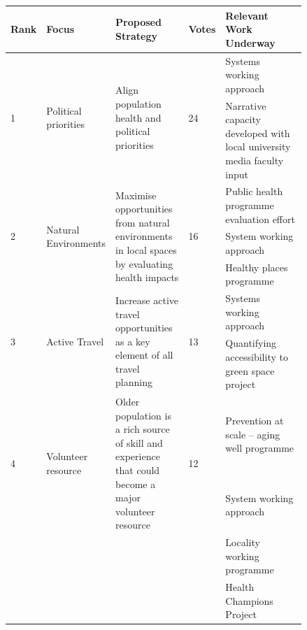 \begin{table}[h]
	\begin{center}
		\footnotesize%
		\begin{tabularx}{\linewidth}{p{0.04\linewidth} p{0.135\linewidth} p{0.275\linewidth} p{0.045\linewidth} p{0.35\linewidth}}
			\toprule
			Rank & Focus & Proposed Strategy & Votes & Relevant Work Underway \\
			\midrule
			\multirow{2}{*}{1} & \multirow{2}{\hsize}{Political priorities} & \multirow{2}{\hsize}{Align population health and political priorities} & \multirow{2}{*}{24} & Systems working approach\vspace{0.5\baselineskip} \\
			& & & & Narrative capacity developed with local university media faculty input\vspace{\baselineskip}\\
			
			\multirow{3}{*}{2} & \multirow{3}{\hsize}{Natural Environments} & \multirow{3}{\hsize}{Maximise opportunities from natural environments in local spaces by evaluating health impacts} & \multirow{3}{*}{16} & Public health programme evaluation effort\vspace{0.5\baselineskip} \\
			& & & & System working approach\vspace{0.5\baselineskip} \\
			& & & & Healthy places programme\vspace{\baselineskip} \\
			
			\multirow{2}{*}{3} & \multirow{2}{\hsize}{Active Travel} & \multirow{2}{\hsize}{Increase active travel opportunities as a key element of all travel planning} & \multirow{2}{*}{13} & Systems working approach\vspace{0.5\baselineskip} \\
			& & & & Quantifying accessibility to green space project\vspace{\baselineskip} \\

			\multirow{2}{*}{4} & \multirow{2}{\hsize}{Volunteer resource} & \multirow{2}{\hsize}{Older population is a rich source of skill and experience that could become a major volunteer resource} & \multirow{2}{*}{12} & Prevention at scale – aging well programme\vspace{0.5\baselineskip} \\			
			& & & & System working approach\vspace{0.5\baselineskip} \\
			& & & & Locality working programme\vspace{0.5\baselineskip} \\
			& & & & Health Champions Project\vspace{\baselineskip} \\


\end{tabularx}
\end{center}
\end{table}

